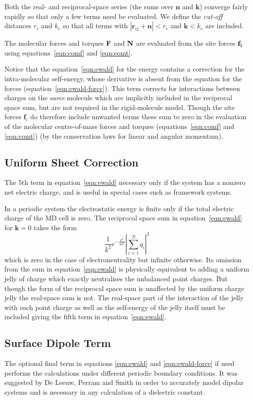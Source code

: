 Both the real- and reciprocal-space series (the sums over $\bm{n}$ and
$\bm{k}$) converge fairly rapidly so that only a few terms need be
evaluated.  We define the {\em cut-off} distances $r_c$ and $k_c$ so
that all terms with $| \bm{r}_{ij} +\bm{n} | < r_c$ and $\bm{k} < k_c$
are included.

The molecular forces and torques $\bf{F}$ and $\bf{N}$ are evaluated
from the site forces $\bf{f}_i$ using equations~\ref{eqn:comf} and
\ref{eqn:comt}.

Notice that the equation~\ref{eqn:ewald} for the energy contains a
correction for the intra-molecular self-energy, whose derivative is
absent from the equation for the forces
(equation~\ref{eqn:ewald-force}).  This term corrects for interactions
between charges on the {\em same} molecule which are implicitly
included in the reciprocal space sum, but are not required in the
rigid-molecule model.  Though the site forces $\bm{f}_i$ do therefore
include unwanted terms these sum to zero in the evaluation of the
molecular centre-of-mass forces and torques (equations~\ref{eqn:comf}
and \ref{eqn:comt}) (by the conservation laws for linear and angular
momentum).

\subsection*{Uniform Sheet Correction}
The 5th term in equation~\ref{eqn:ewald} necessary only if the system
has a nonzero net electric charge, and is useful in special cases such
as framework systems.  

In a periodic system the electrostatic energy is finite only if the
total electric charge of the MD cell is zero.  The reciprocal space
sum in equation~\ref{eqn:ewald} for $\bm{k}=0$ takes the form
\[\frac{1}{k^2}e^{-\frac{k^2}{4 \alpha^2}} \left | \sum_{i=1}^{N} q_i
 \right |^2\] which is zero in the case of electroneutrality but
infinite otherwise.  Its omission from the sum in
equation~\ref{eqn:ewald} is physically equivalent to adding a uniform
jelly of charge which exactly neutralises the unbalanced point
charges.  But though the form of the reciprocal space sum is
unaffected by the uniform charge jelly the real-space sum is not.  The
real-space part of the interaction of the jelly with each point charge
as well as the self-energy of the jelly itself must be included giving
the fifth term in equation~\ref{eqn:ewald}.

\subsection*{Surface Dipole Term}
The optional final term in equations \ref{eqn:ewald} and
\ref{eqn:ewald-force} if used performs the calculations under
different periodic boundary conditions.  It was suggested by De Leeuw,
Perram and Smith\cite{deleeuw:80} in order to accurately model
dipolar systems and is necessary in any calculation of a dielectric
constant. 

